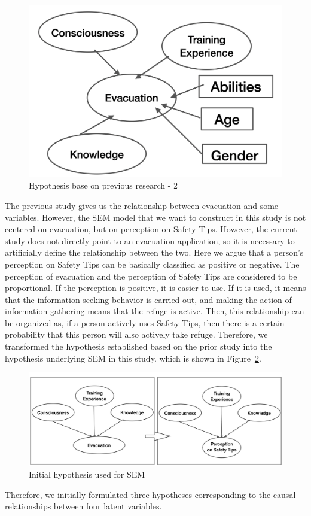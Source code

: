 \begin{figure}[h]
  \includegraphics[width=0.5\linewidth]{Figure/Figure8.png}
  \centering
  \caption{Hypothesis base on previous research - 2 }
  \label{fig8}
\end{figure}

The previous study gives us the relationship between evacuation and some variables. However, the SEM model that we want to construct in this study is not centered on evacuation, but on perception on Safety Tips. However, the current study does not directly point to an evacuation application, so it is necessary to artificially define the relationship between the two. Here we argue that a person's perception on Safety Tips can be basically classified as positive or negative. The perception of evacuation and the perception of Safety Tips are considered to be proportional. If the perception is positive, it is easier to use. If it is used, it means that the information-seeking behavior is carried out, and making the action of information gathering means that the refuge is active. Then, this relationship can be organized as, if a person actively uses Safety Tips, then there is a certain probability that this person will also actively take refuge. Therefore, we transformed the hypothesis established based on the prior study into the hypothesis underlying SEM in this study. which is shown in Figure~\ref{fig30}.

\begin{figure}[h]
  \includegraphics[width=0.5\linewidth]{Figure/Figure30.jpg}
  \centering
  \caption{Initial hypothesis used for SEM}
  \label{fig30}
\end{figure}

Therefore, we initially formulated three hypotheses corresponding to the causal relationships between four latent variables.

